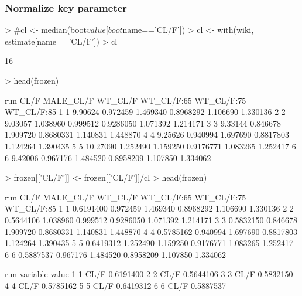 \subsubsection{Normalize key parameter}
\begin{Schunk}
\begin{Sinput}
> #cl <- median(boot$value[boot$name=='CL/F'])
> cl <- with(wiki, estimate[name=='CL/F'])
> cl
\end{Sinput}
\begin{Soutput}
[1] 16
\end{Soutput}
\begin{Sinput}
> head(frozen)
\end{Sinput}
\begin{Soutput}
  run     CL/F MALE_CL/F  WT_CL/F WT_CL/F:65 WT_CL/F:75 WT_CL/F:85
1   1  9.90624  0.972459 1.469340  0.8968292   1.106690   1.330136
2   2  9.03057  1.038960 0.999512  0.9286050   1.071392   1.214171
3   3  9.33144  0.846678 1.909720  0.8680331   1.140831   1.448870
4   4  9.25626  0.940994 1.697690  0.8817803   1.124264   1.390435
5   5 10.27090  1.252490 1.159250  0.9176771   1.083265   1.252417
6   6  9.42006  0.967176 1.484520  0.8958209   1.107850   1.334062
\end{Soutput}
\begin{Sinput}
> frozen[['CL/F']] <- frozen[['CL/F']]/cl
> head(frozen)
\end{Sinput}
\begin{Soutput}
  run      CL/F MALE_CL/F  WT_CL/F WT_CL/F:65 WT_CL/F:75 WT_CL/F:85
1   1 0.6191400  0.972459 1.469340  0.8968292   1.106690   1.330136
2   2 0.5644106  1.038960 0.999512  0.9286050   1.071392   1.214171
3   3 0.5832150  0.846678 1.909720  0.8680331   1.140831   1.448870
4   4 0.5785162  0.940994 1.697690  0.8817803   1.124264   1.390435
5   5 0.6419312  1.252490 1.159250  0.9176771   1.083265   1.252417
6   6 0.5887537  0.967176 1.484520  0.8958209   1.107850   1.334062
\end{Soutput}
\begin{Soutput}
  run variable     value
1   1     CL/F 0.6191400
2   2     CL/F 0.5644106
3   3     CL/F 0.5832150
4   4     CL/F 0.5785162
5   5     CL/F 0.6419312
6   6     CL/F 0.5887537
\end{Soutput}
\end{Schunk}
